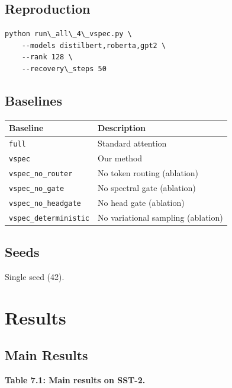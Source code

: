 \subsection{Reproduction}

\begin{lstlisting}
python run\_all\_4\_vspec.py \
    --models distilbert,roberta,gpt2 \
    --rank 128 \
    --recovery\_steps 50
\end{lstlisting}

\subsection{Baselines}

\begin{table}[H]
\centering
\small
\begin{tabular}{ll}
\toprule
\textbf{Baseline} & \textbf{Description} \\
\midrule
\texttt{full} & Standard attention \\
\texttt{vspec} & Our method \\
\texttt{vspec\_no\_router} & No token routing (ablation) \\
\texttt{vspec\_no\_gate} & No spectral gate (ablation) \\
\texttt{vspec\_no\_headgate} & No head gate (ablation) \\
\texttt{vspec\_deterministic} & No variational sampling (ablation) \\
\bottomrule
\end{tabular}
\end{table}

\subsection{Seeds}

Single seed (42).



\section{Results}

\subsection{Main Results}

\textbf{Table 7.1: Main results on SST-2.}

